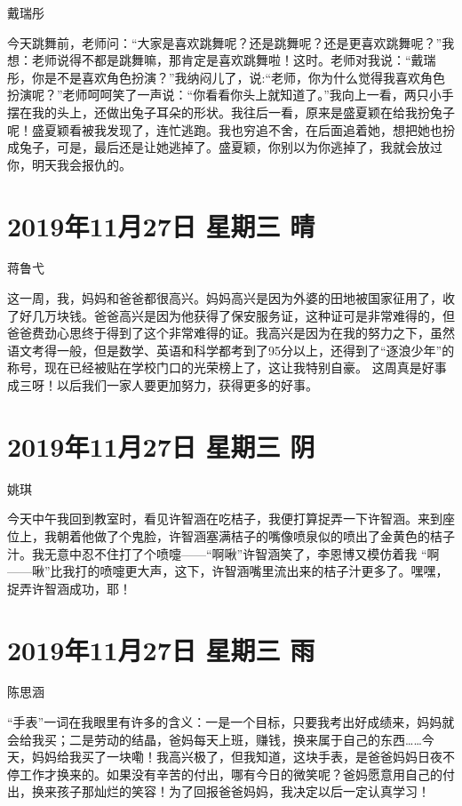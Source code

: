戴瑞彤

今天跳舞前，老师问：``大家是喜欢跳舞呢？还是跳舞呢？还是更喜欢跳舞呢？''我想：老师说得不都是跳舞嘛，那肯定是喜欢跳舞啦！这时。老师对我说：``戴瑞彤，你是不是喜欢角色扮演？''我纳闷儿了，说:``老师，你为什么觉得我喜欢角色扮演呢？''老师呵呵笑了一声说：``你看看你头上就知道了。''我向上一看，两只小手摆在我的头上，还做出兔子耳朵的形状。我往后一看，原来是盛夏颖在给我扮兔子呢！盛夏颖看被我发现了，连忙逃跑。我也穷追不舍，在后面追着她，想把她也扮成兔子，可是，最后还是让她逃掉了。盛夏颖，你别以为你逃掉了，我就会放过你，明天我会报仇的。

\section{2019年11月27日 星期三 晴}

蒋鲁弋

这一周，我，妈妈和爸爸都很高兴。妈妈高兴是因为外婆的田地被国家征用了，收了好几万块钱。爸爸高兴是因为他获得了保安服务证，这种证可是非常难得的，但爸爸费劲心思终于得到了这个非常难得的证。我高兴是因为在我的努力之下，虽然语文考得一般，但是数学、英语和科学都考到了95分以上，还得到了``逐浪少年''的称号，现在已经被贴在学校门口的光荣榜上了，这让我特别自豪。
这周真是好事成三呀！以后我们一家人要更加努力，获得更多的好事。

\section{2019年11月27日 星期三 阴}

姚琪

今天中午我回到教室时，看见许智涵在吃桔子，我便打算捉弄一下许智涵。来到座位上，我朝着他做了个鬼脸，许智涵塞满桔子的嘴像喷泉似的喷出了金黄色的桔子汁。我无意中忍不住打了个喷嚏------``啊啾''许智涵笑了，李恩博又模仿着我
``啊------啾''比我打的喷嚏更大声，这下，许智涵嘴里流出来的桔子汁更多了。嘿嘿，捉弄许智涵成功，耶！

\section{2019年11月27日 星期三 雨}

陈思涵

``手表''一词在我眼里有许多的含义：一是一个目标，只要我考出好成绩来，妈妈就会给我买；二是劳动的结晶，爸妈每天上班，赚钱，换来属于自己的东西\ldots\ldots 今天，妈妈给我买了一块嘞！我高兴极了，但我知道，这块手表，是爸爸妈妈日夜不停工作才换来的。如果没有辛苦的付出，哪有今日的微笑呢？爸妈愿意用自己的付出，换来孩子那灿烂的笑容！为了回报爸爸妈妈，我决定以后一定认真学习！

